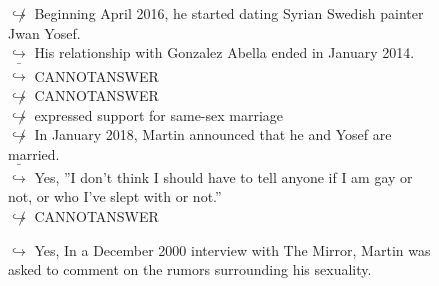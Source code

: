 \documentclass[11pt,a4paper, onecolumn]{article}
\begin{document}
\begin{figure}[t] \small \begin{tcolorbox}[boxsep=0pt,left=5pt,right=0pt,top=2pt,colback = yellow!5] \begin{dialogue}
 \small 
\colorbox{pink!25}{$\not\hookrightarrow$}
{ Beginning April 2016, he started dating Syrian Swedish painter Jwan Yosef. }
\\
\colorbox{pink!25}{$\hookrightarrow$}
{ His relationship with Gonzalez Abella ended in January 2014. }
\\
\colorbox{pink!25}{ $\bar{\hookrightarrow}$}
{ CANNOTANSWER }
\\
\colorbox{pink!25}{$\not\hookrightarrow$}
{ CANNOTANSWER }
\\
\colorbox{pink!25}{$\not\hookrightarrow$}
{ expressed support for same-sex marriage }
\\
\colorbox{pink!25}{$\not\hookrightarrow$}
{ In January 2018, Martin announced that he and Yosef are married. }
\\
\colorbox{pink!25}{ $\bar{\hookrightarrow}$}
\colorbox{red!25}{Yes,}
{ ''I don't think I should have to tell anyone if I am gay or not, or who I've slept with or not.'' }
\\
\colorbox{pink!25}{$\not\hookrightarrow$}
{ CANNOTANSWER }
 \end{dialogue}\end{tcolorbox}\end{figure}\begin{figure}[t] \small \begin{tcolorbox}[boxsep=0pt,left=5pt,right=0pt,top=2pt,colback = yellow!5] \begin{dialogue}
 \small 
\colorbox{pink!25}{$\hookrightarrow$}
\colorbox{red!25}{Yes,}
{ In a December 2000 interview with The Mirror, Martin was asked to comment on the rumors surrounding his sexuality. }
\\
 \end{dialogue}\end{tcolorbox}\end{figure}
\end{document}
